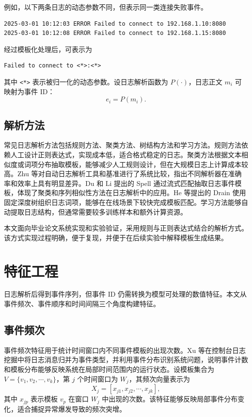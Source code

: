 例如，以下两条日志的动态参数不同，但表示同一类连接失败事件。

\begin{verbatim}
2025-03-01 10:12:03 ERROR Failed to connect to 192.168.1.10:8080
2025-03-01 10:12:08 ERROR Failed to connect to 192.168.1.15:8080
\end{verbatim}

经过模板化处理后，可表示为
\begin{verbatim}
Failed to connect to <*>:<*>
\end{verbatim}
其中 \texttt{<*>} 表示被归一化的动态参数。设日志解析函数为 $P(\cdot)$，日志正文 $m_i$ 可映射为事件 ID：
\begin{equation}
    e_i=P(m_i).
\end{equation}

\subsection{解析方法}

常见日志解析方法包括规则方法、聚类方法、树结构方法和学习方法。规则方法依赖人工设计正则表达式，实现成本低，适合格式稳定的日志。聚类方法根据文本相似度或词项分布抽取模板，能够减少人工规则设计，但在大规模日志上计算成本较高。Zhu 等对自动日志解析工具和基准进行了系统比较，指出不同解析器在准确率和效率上具有明显差异\cite{zhu2019tools}。Du 和 Li 提出的 Spell 通过流式匹配抽取日志事件模板，体现了聚类和序列相似性方法在日志解析中的应用\cite{du2016spell}。He 等提出的 Drain 使用固定深度树组织日志词项，能够在在线场景下较快完成模板匹配\cite{he2017drain}。学习方法能够自动提取日志结构，但通常需要较多训练样本和额外计算资源。

本文面向毕业论文系统实现和实验验证，采用规则与正则表达式结合的解析方式。该方式实现过程明确，便于复现，并便于在后续实验中解释模板生成结果。

\section{特征工程}

日志解析后得到事件序列，但事件 ID 仍需转换为模型可处理的数值特征。本文从事件频次、事件顺序和时间间隔三个角度构建特征。

\subsection{事件频次}

事件频次特征用于统计时间窗口内不同事件模板的出现次数。Xu 等在控制台日志挖掘中将日志消息归并为事件类型，并利用事件分布识别系统问题，说明事件计数和模板分布能够反映系统在局部时间范围内的运行状态\cite{xu2009detecting}。设模板集合为 $V=\{v_1,v_2,\cdots,v_k\}$，第 $j$ 个时间窗口为 $W_j$，其频次向量表示为
\begin{equation}
    X_j=[x_{j1},x_{j2},\cdots,x_{jk}],
\end{equation}
其中 $x_{jp}$ 表示模板 $v_p$ 在窗口 $W_j$ 中出现的次数。该特征能够反映局部事件分布变化，适合捕捉异常爆发导致的频次突增。

